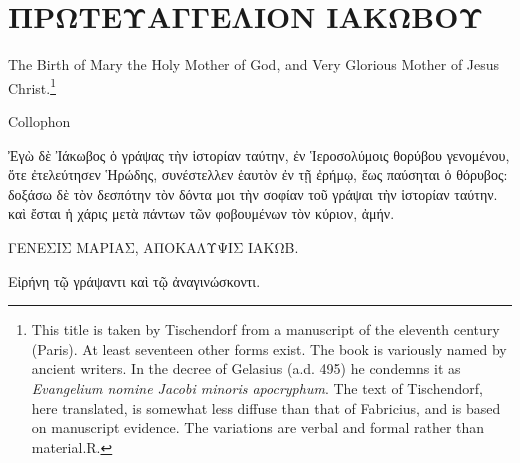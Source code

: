 \documentclass[12pt]{book} %
\begin{document}
\chapter*{ΠΡΩΤΕΥΑΓΓΕΛΙΟΝ ΙΑΚΩΒΟΥ}

The Birth of Mary the Holy Mother of God, and Very Glorious Mother of Jesus Christ.\footnote{This title is taken by Tischendorf from a manuscript of the eleventh century (Paris). At least seventeen other forms exist. The book is variously named by ancient writers. In the decree of Gelasius (a.d. 495) he condemns it as \textit{Evangelium nomine Jacobi minoris apocryphum}. The text of Tischendorf, here translated, is somewhat less diffuse than that of Fabricius, and is based on manuscript evidence. The variations are verbal and formal rather than material.\textemdash R.}

\begin{pairs}
\begin{Leftside}\beginnumbering


\endnumbering\end{Leftside}
\begin{Rightside}\beginnumbering


\endnumbering\end{Rightside}
\end{pairs}
\Columns

Collophon

Ἐγὼ δὲ Ἰάκωβος ὁ γράψας τὴν ἱστορίαν ταύτην, ἐν Ἱεροσολύμοις θορύβου γενομένου, ὅτε ἐτελεύτησεν Ἡρώδης, συνέστελλεν ἑαυτὸν ἐν τῇ ἐρήμῳ, ἕως παύσηται ὁ θόρυβος: δοξάσω δὲ τὸν δεσπότην τὸν δόντα μοι τὴν σοφίαν τοῦ γράψαι τὴν ἱστορίαν ταύτην. καὶ ἔσται ἡ χάρις μετὰ πάντων τῶν φοβουμένων τὸν κύριον, ἀμήν.

ΓΕΝΕΣΙΣ ΜΑΡΙΑΣ, ΑΠΟΚΑΛΥΨΙΣ ΙΑΚΩΒ.

Εἰρήνη τῷ γράψαντι καὶ τῷ ἀναγινώσκοντι.
\end{document}

